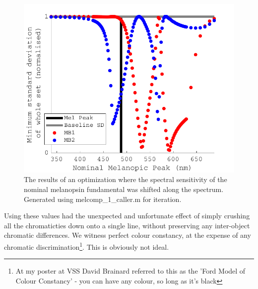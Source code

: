 \begin{figure}[ht]
    \includegraphics[max width=\textwidth]{figs/comp/melcomp_1_caller/opt.pdf}
    \caption{The results of an optimization where the spectral sensitivity of the nominal melanopsin fundamental was shifted along the spectrum. Generated using melcomp\_1\_caller.m for iteration.}
    \label{fig:opt}
\end{figure} 

Using these values had the unexpected and unfortunate effect of simply crushing all the chromaticties down onto a single line, without preserving any inter-object chromatic differences. We witness perfect colour constancy, at the expense of any chromatic discrimination\footnote{At my poster at VSS David Brainard referred to this as the 'Ford Model of Colour Constancy' - you can have any colour, so long as it's black}. This is obviously not ideal.

